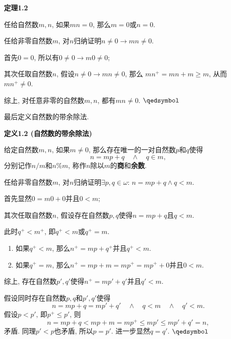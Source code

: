 \newpage

\hypertarget{sec:定理1.2}{}
\noindent\textbf{定理1.2}

任给自然数$m,n$, 如果$mn=0$, 那么$m=0$或$n=0$.


任给非零自然数$m$, 对$n$归纳证明$n\neq 0\to mn\neq 0$.

首先$0=0$, 所以有$0\neq 0\to m0\neq 0$;

其次任取自然数$n$, 假设$n\neq 0\to mn\neq 0$, 那么
$mn^+=mn+m\geqslant m$, 从而$mn^+\neq 0$.

综上, 对任意非零的自然数$m,n$, 都有$mn\neq 0$. \hfill $\qedsymbol$

\vspace{10pt}

最后定义自然数的带余除法.

\vspace{10pt}

\hypertarget{sec:定义1.2}{}
\noindent\textbf{定义1.2 (自然数的带余除法)}

给定自然数$m,n$, 如果$m\neq 0$, 那么存在唯一的一对自然数$p$和$q$使得
\[
    n=mp+q\quad\land\quad q\in m,
\]
分别记作$n/m$和$n\%m$, 称作$n$除以$m$的\textbf{商}和\textbf{余数}.



任给非零自然数$m$, 对$n$归纳证明$\exists p,q\in\omega:\,n=mp+q\land q<m$.

首先显然$0=m0+0$并且$0<m$;

其次任取自然数$n$, 假设存在自然数$p,q$使得$n=mp+q$且$q<m$.

此时$q^+<m^+$, 即$q^+<m$或$q^+=m$.

\begin{enumerate}
    \item 如果$q^+<m$, 那么$n^+=mp+q^+$并且$q^+<m$.
    \item 如果$q^+=m$, 那么$n^+=mp+m=mp^+=mp^++0$并且$0<m$.
\end{enumerate}
综上, 存在自然数$p',q'$使得$n^+=mp'+q'$并且$q'<m$.


假设同时存在自然数$p,q$和$p',q'$使得
\[
    n=mp+q=mp'+q'\quad\land\quad q<m\quad\land\quad q'<m.
\]
假设$p<p'$, 即$p^+\leqslant p'$, 则
\[
    n=mp+q<mp+m=mp^+\leqslant mp'\leqslant mp'+q'=n,
\]
矛盾. 同理$p'<p$也矛盾, 所以$p=p'$. 进一步显然$q=q'$. \hfill $\qedsymbol$

